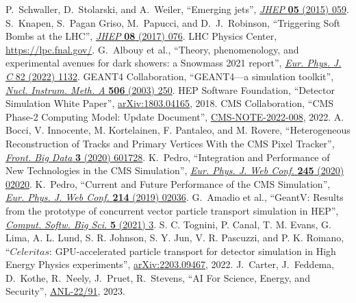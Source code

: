 \begin{thebibliography}{99}
 P.~Schwaller, D.~Stolarski, and A.~Weiler, ``Emerging jets'', \href{http://dx.doi.org/10.1007/JHEP05(2015)059}{\textit{JHEP} \textbf{05} (2015) 059}.
 S.~Knapen, S.~Pagan Griso, M.~Papucci, and D.~J.~Robinson, ``Triggering Soft Bombs at the LHC'', \href{http://dx.doi.org/10.1007/JHEP08(2017)076}{\textit{JHEP} \textbf{08} (2017) 076}.
 LHC Physics Center, \href{https://lpc.fnal.gov/}{https://lpc.fnal.gov/}.
 G.~Albouy et al., ``Theory, phenomenology, and experimental avenues for dark showers: a Snowmass 2021 report'', \href{https://doi.org/10.1140/epjc/s10052-022-11048-8}{\textit{Eur. Phys. J. C} 82 (2022) 1132}.
 {GEANT4} Collaboration, ``{GEANT4}---a simulation toolkit'', \href{http://dx.doi.org/10.1016/S0168-9002(03)01368-8}{\textit{Nucl. Instrum. Meth. A} \textbf{506} (2003) 250}.
 HEP Software Foundation, ``Detector Simulation White Paper'', \href{https://arxiv.org/abs/1803.04165}{arXiv:1803.04165}, 2018.
 CMS Collaboration, ``CMS Phase-2 Computing Model: Update Document'', \href{https://cds.cern.ch/record/2815292}{CMS-NOTE-2022-008}, 2022.
 A. Bocci, V. Innocente, M. Kortelainen, F. Pantaleo, and M. Rovere, ``Heterogeneous Reconstruction of Tracks and Primary Vertices With the CMS Pixel Tracker'', \href{https://doi.org/10.3389/fdata.2020.601728}{\textit{Front. Big Data} \textbf{3} (2020) 601728}.
 K.~Pedro, ``Integration and Performance of New Technologies in the CMS Simulation'', \href{https://doi.org/10.1051/epjconf/202024502020}{\textit{Eur. Phys. J. Web Conf.} \textbf{245} (2020) 02020}.
 K.~Pedro, ``Current and Future Performance of the CMS Simulation'', \href{https://doi.org/10.1051/epjconf/201921402036}{\textit{Eur. Phys. J. Web Conf.} \textbf{214} (2019) 02036}.
 G.~Amadio et al., ``GeantV: Results from the prototype of concurrent vector particle transport simulation in HEP'', \href{https://doi.org/10.1007/s41781-020-00048-6}{\textit{Comput. Softw. Big Sci.} \textbf{5} (2021) 3}.
 S. C. Tognini, P. Canal, T. M. Evans, G. Lima, A. L. Lund, S. R. Johnson, S. Y. Jun, V. R. Pascuzzi, and P. K. Romano, ``$Celeritas$: GPU-accelerated particle transport for detector simulation in High Energy Physics experiments'', \href{https://arxiv.org/abs/2203.09467}{arXiv:2203.09467}, 2022.
 J.~Carter, J.~Feddema, D.~Kothe, R.~Neely, J.~Pruet, R.~Stevens, ``AI For Science, Energy, and Security'', \href{https://www.anl.gov/ai-for-science-report}{ANL-22/91}, 2023.

\end{thebibliography}
